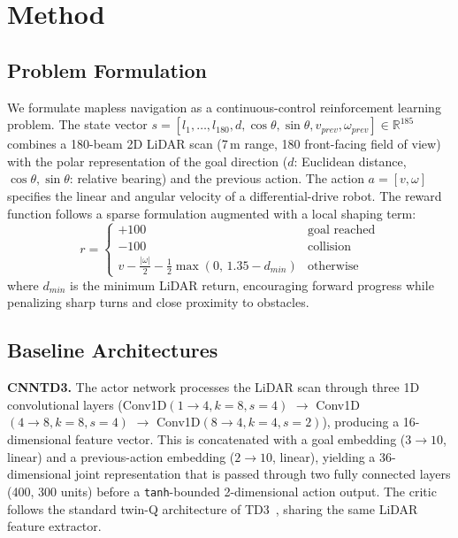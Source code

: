 \section{Method}
\label{sec:method}

\subsection{Problem Formulation}

We formulate mapless navigation as a continuous-control reinforcement
learning problem. The state vector
$s = [l_1, \ldots, l_{180}, d, \cos\theta, \sin\theta, v_{prev}, \omega_{prev}]
\in \mathbb{R}^{185}$
combines a 180-beam 2D LiDAR scan (7\,m range, 180\textdegree{} front-facing
field of view) with the polar representation of the goal direction
($d$: Euclidean distance, $\cos\theta, \sin\theta$: relative bearing)
and the previous action. The action $a = [v, \omega]$ specifies the
linear and angular velocity of a differential-drive robot. The reward
function follows a sparse formulation augmented with a local shaping
term:
\begin{equation}
r = \begin{cases}
+100 & \text{goal reached} \\
-100 & \text{collision} \\
v - \frac{|\omega|}{2} - \frac{1}{2}\max(0,\, 1.35 - d_{min}) & \text{otherwise}
\end{cases}
\end{equation}
where $d_{min}$ is the minimum LiDAR return, encouraging forward
progress while penalizing sharp turns and close proximity to obstacles.

\subsection{Baseline Architectures}

\textbf{CNNTD3.} The actor network processes the LiDAR scan through
three 1D convolutional layers
(Conv1D$(1{\to}4, k{=}8, s{=}4)$ $\to$
Conv1D$(4{\to}8, k{=}8, s{=}4)$ $\to$
Conv1D$(8{\to}4, k{=}4, s{=}2)$), producing a 16-dimensional feature
vector. This is concatenated with a goal embedding
($3{\to}10$, linear) and a previous-action embedding ($2{\to}10$,
linear), yielding a 36-dimensional joint representation that is passed
through two fully connected layers (400, 300 units) before a
\texttt{tanh}-bounded 2-dimensional action output. The critic follows
the standard twin-Q architecture of TD3~\cite{fujimoto2018td3}, sharing
the same LiDAR feature extractor.

